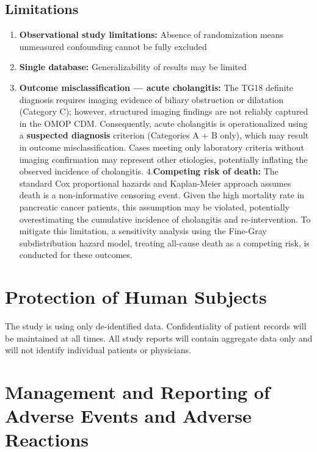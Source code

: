 \documentclass[
  12pt,
]{article}
\providecommand{\tightlist}{%
  \setlength{\itemsep}{0pt}\setlength{\parskip}{0pt}}
\begin{document}
\subsection{Limitations}\label{limitations}

\begin{enumerate}
\def\labelenumi{\arabic{enumi}.}
\tightlist
\item
  \textbf{Observational study limitations:} Absence of randomization means unmeasured confounding cannot be fully excluded
\item
  \textbf{Single database:} Generalizability of results may be limited
\item
  \textbf{Outcome misclassification --- acute cholangitis:} The TG18 definite diagnosis requires imaging evidence of biliary obstruction or dilatation (Category C); however, structured imaging findings are not reliably captured in the OMOP CDM. Consequently, acute cholangitis is operationalized using a \textbf{suspected diagnosis} criterion (Categories A + B only), which may result in outcome misclassification. Cases meeting only laboratory criteria without imaging confirmation may represent other etiologies, potentially inflating the observed incidence of cholangitis.
  4.\textbf{Competing risk of death:} The standard Cox proportional hazards and Kaplan-Meier approach assumes death is a non-informative censoring event. Given the high mortality rate in pancreatic cancer patients, this assumption may be violated, potentially overestimating the cumulative incidence of cholangitis and re-intervention. To mitigate this limitation, a sensitivity analysis using the Fine-Gray subdistribution hazard model, treating all-cause death as a competing risk, is conducted for these outcomes.
\end{enumerate}

\section{Protection of Human Subjects}\label{protection-of-human-subjects}

The study is using only de-identified data. Confidentiality of patient records will be maintained at all times. All study reports will contain aggregate data only and will not identify individual patients or physicians.

\section{Management and Reporting of Adverse Events and Adverse Reactions}\label{management-and-reporting-of-adverse-events-and-adverse-reactions}
\end{document}
